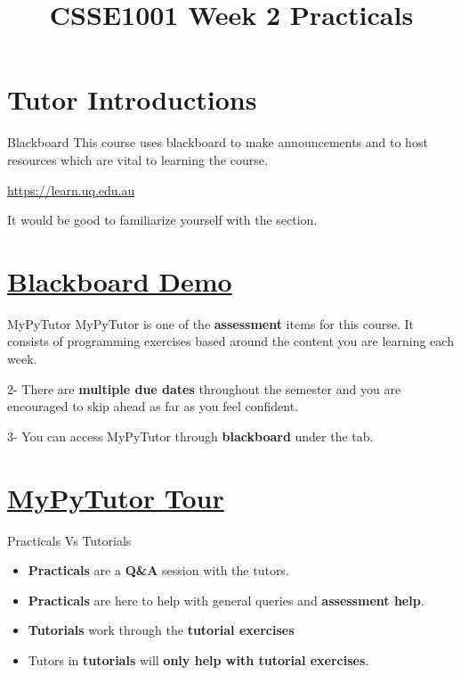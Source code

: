 \documentclass[week2]{csse1001}
\title{CSSE1001 Week 2 Practicals}
\begin{document}
\begin{frame} 
\maketitle
\end{frame}

\section{Tutor Introductions}

\begin{topic}{Blackboard}
This course uses blackboard to make announcements and to host resources which
are vital to learning the course.

\url{https://learn.uq.edu.au}

It would be good to familiarize yourself with the 
section.
\end{topic}

\section{\href{https://learn.uq.edu.au}{Blackboard Demo}}

\begin{topic}{MyPyTutor}
MyPyTutor is one of the \textbf{assessment} items for this course. It consists of
programming exercises based around the content you are learning each week.

\begin{subtopic}{2-}
There are \textbf{multiple due dates} throughout the semester and you are encouraged
to skip ahead as far as you feel confident.
\end{subtopic}

\begin{subtopic}{3-}
You can access MyPyTutor through \textbf{blackboard} under the  tab.
\end{subtopic}
\end{topic}

\section{\href{https://learn.uq.edu.au}{MyPyTutor Tour}}

\begin{topic}{Practicals Vs Tutorials}
\begin{itemize}
	\item \textbf{Practicals} are a \textbf{Q\&A} session with the tutors.
	\item \textbf{Practicals} are here to help with general queries and \textbf{assessment help}.
	\item \textbf{Tutorials} work through the \textbf{tutorial exercises}
	\item Tutors in \textbf{tutorials} will \textbf{only help with tutorial exercises}.
\end{itemize}
\end{topic}
\end{document}
